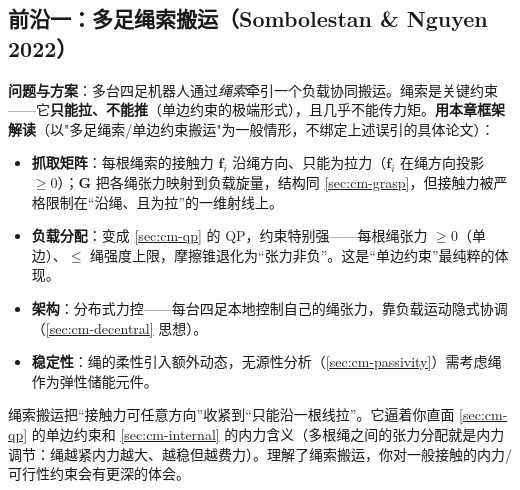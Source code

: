 \subsection{前沿一：多足绳索搬运（Sombolestan \& Nguyen 2022）}
\label{sec:cm-frontier-cable}
\textbf{问题与方案}：多台四足机器人通过\emph{绳索}牵引一个负载协同搬运\cite{sombolestan2022collaborative}。绳索是关键约束——它\textbf{只能拉、不能推}（单边约束的极端形式），且几乎不能传力矩。\textbf{用本章框架解读}（以"多足绳索/单边约束搬运"为一般情形，不绑定上述误引的具体论文）：
\begin{itemize}
  \item \textbf{抓取矩阵}：每根绳索的接触力 $\mathbf{f}_i$ 沿绳方向、只能为拉力（$\mathbf{f}_i$ 在绳方向投影 $\ge 0$）；$\mathbf{G}$ 把各绳张力映射到负载旋量，结构同 \cref{sec:cm-grasp}，但接触力被严格限制在“沿绳、且为拉”的一维射线上。
  \item \textbf{负载分配}：变成 \cref{sec:cm-qp} 的 QP，约束特别强——每根绳张力 $\ge 0$（单边）、$\le$ 绳强度上限，摩擦锥退化为“张力非负”。这是“单边约束”最纯粹的体现。
  \item \textbf{架构}：分布式力控——每台四足本地控制自己的绳张力，靠负载运动隐式协调（\cref{sec:cm-decentral} 思想）。
  \item \textbf{稳定性}：绳的柔性引入额外动态，无源性分析（\cref{sec:cm-passivity}）需考虑绳作为弹性储能元件。
\end{itemize}

\begin{insight}
绳索搬运把“接触力可任意方向”收紧到“只能沿一根线拉”。它逼着你直面 \cref{sec:cm-qp} 的单边约束和 \cref{sec:cm-internal} 的内力含义（多根绳之间的张力分配就是内力调节：绳越紧内力越大、越稳但越费力）。理解了绳索搬运，你对一般接触的内力/可行性约束会有更深的体会。
\end{insight}

